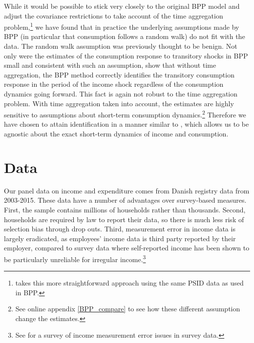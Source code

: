\documentclass[titlepage]{\econtex}\newcommand{\texname}{ConsumptionHeterogeneity}
\begin{document}
While it would be possible to stick very closely to the original BPP model and adjust the covariance restrictions to take account of the time aggregation problem,\footnote{\cite{crawley_time_2019} takes this more straightforward approach using the same PSID data as used in BPP.} we have found that in practice the underlying assumptions made by BPP (in particular that consumption follows a random walk) do not fit with the data. The random walk assumption was previously thought to be benign. Not only were the estimates of the consumption response to transitory shocks in BPP small and consistent with such an assumption, \cite{kaplan_how_2010} show that without time aggregation, the BPP method correctly identifies the transitory consumption response in the period of the income shock regardless of the consumption dynamics going forward. This fact is again not robust to the time aggregation problem. With time aggregation taken into account, the estimates are highly sensitive to assumptions about short-term consumption dynamics.\footnote{See online appendix \ref{BPP_compare} to see how these different assumption change the estimates.} Therefore we have chosen to attain identification in a manner similar to \cite{carroll_nature_1997}, which allows us to be agnostic about the exact short-term dynamics of income and consumption.

\section{Data}
Our panel data on income and expenditure comes from Danish registry data from 2003-2015. These data have a number of advantages over survey-based measures. First, the sample contains millions of households rather than thousands. Second, households are required by law to report their data, so there is much less risk of selection bias through drop outs. Third, measurement error in income data is largely eradicated, as employees' income data is third party reported by their employer, compared to survey data where self-reported income has been shown to be particularly unreliable for irregular income.\footnote{See \cite{david_income_nodate} for a survey of income measurement error issues in survey data.}
\end{document}
